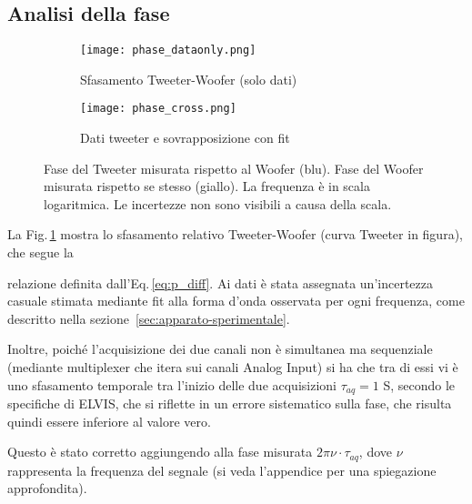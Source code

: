 \documentclass[../Relazione_circuiti]{subfiles}
\begin{document}
\subsection{Analisi della fase}

  \begin{figure}[H]
    \centering

    \begin{subfigure}{=0.49\textwidth}
      \centering
      \texttt{[image: phase\_dataonly.png]}
      \caption{Sfasamento Tweeter-Woofer (solo dati)}
      \label{fig:pdiff_dataonly}

    \end{subfigure}
    \hfill
    \begin{subfigure}{=0.49\textwidth}
      \centering
      \texttt{[image: phase\_cross.png]}
      \caption{Dati tweeter e sovrapposizione con fit}
      \label{fig:pdiff_fit_data}

    \end{subfigure}

    \caption{
      Fase del Tweeter misurata rispetto al Woofer (blu). Fase del Woofer misurata rispetto se stesso (giallo).
      La frequenza è in scala logaritmica. Le incertezze non sono visibili a causa della scala.
    }
    \label{fig:phase_diff}

  \end{figure}

  La Fig.\,\ref{fig:pdiff_dataonly} mostra lo sfasamento relativo Tweeter-Woofer (curva Tweeter in figura), che segue la

  relazione definita dall'Eq.\,\eqref{eq:p_diff}.
  Ai dati è stata assegnata un'incertezza casuale stimata mediante fit alla forma d'onda osservata per ogni frequenza,
  come descritto nella sezione~\ref{sec:apparato-sperimentale}.

  Inoltre, poiché l'acquisizione dei due canali non è simultanea ma sequenziale (mediante multiplexer che itera sui
  canali Analog Input) si ha che tra di essi vi è uno sfasamento temporale tra l'inizio delle due acquisizioni
  $\tau_{aq}=1$ \textmu S, secondo le specifiche di ELVIS, che si riflette in un errore
  sistematico sulla fase, che risulta quindi essere inferiore al valore vero.

  Questo è stato corretto aggiungendo alla fase misurata $ 2 \pi \nu \cdot \tau_{aq}$, dove $\nu$
  rappresenta la frequenza del segnale (si veda l'appendice per una spiegazione approfondita).
\end{document}
